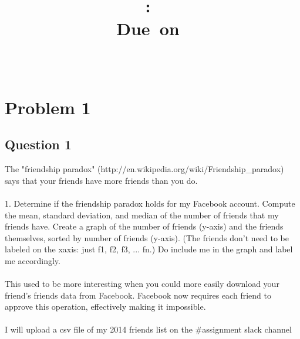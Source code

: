 \documentclass[10pt,letterpaper]{article}
\title{
\vspace{2in}
\textmd{\textbf{\hmwkClass:\ \hmwkTitle}}\\
\normalsize\vspace{0.1in}\small{Due\ on\ \hmwkDueDate}\\
\vspace{0.1in}\large{\textit{\hmwkClassInstructor\ \hmwkClassTime}}
\vspace{3in}
}
\author{\textbf{\hmwkAuthorName}}
\begin{document}
\maketitle


\pagebreak
\tableofcontents
\pagebreak 





\section{Problem 1}
\subsection{Question 1}
The "friendship paradox" (http://en.wikipedia.org/wiki/Friendship\_paradox)
says that your friends have more friends than you do.  \\
\\
1.  Determine if the friendship paradox holds for my Facebook
account.\* Compute the mean, standard deviation, and median of the
number of friends that my friends have.  Create a graph of the
number of friends (y-axis) and the friends themselves, sorted by
number of friends (y-axis).  (The friends don't need to be labeled
on the x\-axis: just f1, f2, f3, ... fn.)  Do include me in the graph
and label me accordingly.\\
\\
\* \= This used to be more interesting when you could more easily download
your friend's friends data from Facebook.  Facebook now requires each
friend to approve this operation, effectively making it impossible.\\
\\
I will upload a csv file of my 2014 friends list on the \#assignment slack channel\\
\\
\end{document}
